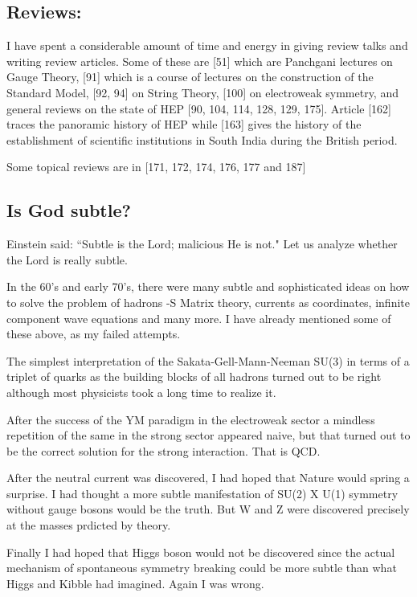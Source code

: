 \vspace{-\topsep}
\subsection*{Reviews:}
\vskip -8pt
I have spent a considerable amount of time and energy in giving review 
talks and writing review articles. Some of these are [51] which are 
Panchgani lectures on Gauge Theory, [91] which is a course of lectures 
on the construction of the Standard Model, [92, 94] on String Theory, 
[100] on electroweak symmetry, and general reviews on the state of HEP 
[90, 104, 114, 128, 129, 175]. Article [162] traces the panoramic history of 
HEP while [163] gives the history of the establishment of scientific 
institutions in South India during the British period.

Some topical reviews are in [171, 172, 174, 176, 177 and 187]

\vspace{-\topsep}
\subsection*{Is God subtle?}
\vskip -8pt
Einstein said: ``Subtle is the Lord; malicious He is not." Let us analyze 
whether the Lord is really subtle.


In the 60's and early 70's, there were many subtle and sophi\-sticated 
ideas on how to solve the problem of hadrons -S Matrix theory, currents 
as coordinates, infinite component wave equations and many more. I have 
already mentioned some of these above, as my failed attempts.


The simplest interpretation of the Sakata-Gell-Mann-Nee\-man SU(3) in 
terms of a triplet of quarks as the building blocks of all hadrons 
turned out to be right although most physicists took a long time to 
realize it.


After the success of the YM paradigm in the electroweak sector a 
mindless repetition of the same in the strong sector appeared naive, but 
that turned out to be the correct solution for the strong interaction. 
That is QCD.


After the neutral current was discovered, I had hoped that Nature would 
spring a surprise. I had thought a more subtle manifestation of SU(2) X 
U(1) symmetry without gauge bosons would be the truth. But W and Z were 
discovered precisely at the masses prdicted by theory.


Finally I had hoped that Higgs boson would not be discove\-red since the 
actual mechanism of spontaneous symmetry brea\-king could be more subtle 
than what Higgs and Kibble had imagi\-ned. Again I was wrong.


